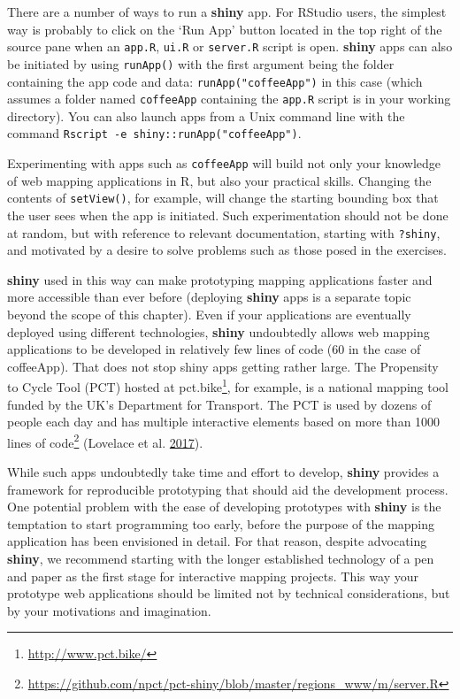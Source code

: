 \documentclass[]{krantz}
\let\rmarkdownfootnote\footnote%
\def\footnote{\protect\rmarkdownfootnote}
\renewcommand{\href}[2]{#2\footnote{\url{#1}}}
\let\BeginKnitrBlock\begin \let\EndKnitrBlock\end
\begin{document}
\BeginKnitrBlock{rmdnote}
There are a number of ways to run a \textbf{shiny} app.
For RStudio users, the simplest way is probably to click on the `Run App' button located in the top right of the source pane when an \texttt{app.R}, \texttt{ui.R} or \texttt{server.R} script is open.
\textbf{shiny} apps can also be initiated by using \texttt{runApp()} with the first argument being the folder containing the app code and data: \texttt{runApp("coffeeApp")} in this case (which assumes a folder named \texttt{coffeeApp} containing the \texttt{app.R} script is in your working directory).
You can also launch apps from a Unix command line with the command \texttt{Rscript\ -e\ \textquotesingle{}shiny::runApp("coffeeApp")\textquotesingle{}}.
\EndKnitrBlock{rmdnote}

Experimenting with apps such as \texttt{coffeeApp} will build not only your knowledge of web mapping applications in R, but also your practical skills.
Changing the contents of \texttt{setView()}, for example, will change the starting bounding box that the user sees when the app is initiated.
Such experimentation should not be done at random, but with reference to relevant documentation, starting with \texttt{?shiny}, and motivated by a desire to solve problems such as those posed in the exercises.

\textbf{shiny} used in this way can make prototyping mapping applications faster and more accessible than ever before (deploying \textbf{shiny} apps is a separate topic beyond the scope of this chapter).
Even if your applications are eventually deployed using different technologies, \textbf{shiny} undoubtedly allows web mapping applications to be developed in relatively few lines of code (60 in the case of coffeeApp).
That does not stop shiny apps getting rather large.
The Propensity to Cycle Tool (PCT) hosted at \href{http://www.pct.bike/}{pct.bike}, for example, is a national mapping tool funded by the UK's Department for Transport.
The PCT is used by dozens of people each day and has multiple interactive elements based on more than 1000 lines of \href{https://github.com/npct/pct-shiny/blob/master/regions_www/m/server.R}{code} (Lovelace et al. \protect\hyperlink{ref-lovelace_propensity_2017}{2017}).

While such apps undoubtedly take time and effort to develop, \textbf{shiny} provides a framework for reproducible prototyping that should aid the development process.
One potential problem with the ease of developing prototypes with \textbf{shiny} is the temptation to start programming too early, before the purpose of the mapping application has been envisioned in detail.
For that reason, despite advocating \textbf{shiny}, we recommend starting with the longer established technology of a pen and paper as the first stage for interactive mapping projects.
This way your prototype web applications should be limited not by technical considerations, but by your motivations and imagination.
\end{document}
